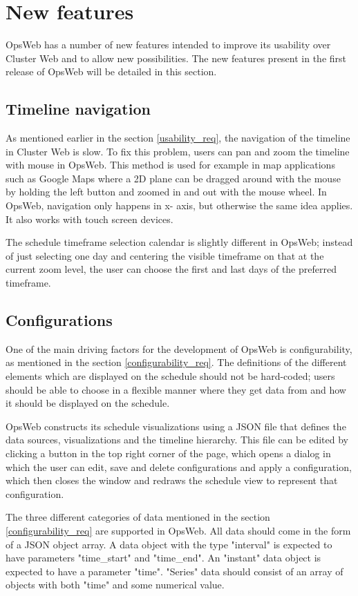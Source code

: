\section{New features}
OpsWeb has a number of new features intended to improve its usability over Cluster Web and to allow new possibilities. The new features present in the first release of OpsWeb will be detailed in this section.

\subsection{Timeline navigation} \label{opsweb_nav}
As mentioned earlier in the section \ref{usability_req}, the navigation of the timeline in Cluster Web is slow. To fix this problem, users can pan and zoom the timeline with mouse in OpsWeb. This method is used for example in map applications such as Google Maps where a 2D plane can be dragged around with the mouse by holding the left button and zoomed in and out with the mouse wheel. In OpsWeb, navigation only happens in x- axis, but otherwise the same idea applies. It also works with touch screen devices.

The schedule timeframe selection calendar is slightly different in OpsWeb; instead of just selecting one day and centering the visible timeframe on that at the current zoom level, the user can choose the first and last days of the preferred timeframe.

\subsection{Configurations} \label{opsweb_config}
One of the main driving factors for the development of OpsWeb is configurability, as mentioned in the section \ref{configurability_req}. The definitions of the different elements which are displayed on the schedule should not be hard-coded; users should be able to choose in a flexible manner where they get data from and how it should be displayed on the schedule.

OpsWeb constructs its schedule visualizations using a JSON file that defines the data sources, visualizations and the timeline hierarchy. This file can be edited by clicking a button in the top right corner of the page, which opens a dialog in which the user can edit, save and delete configurations and apply a configuration, which then closes the window and redraws the schedule view to represent that configuration.

The three different categories of data mentioned in the section \ref{configurability_req} are supported in OpsWeb. All data should come in the form of a JSON object array. A data object with the type "interval" is expected to have parameters "time\_start" and "time\_end". An "instant" data object is expected to have a parameter "time". "Series" data should consist of an array of objects with both "time" and some numerical value.

